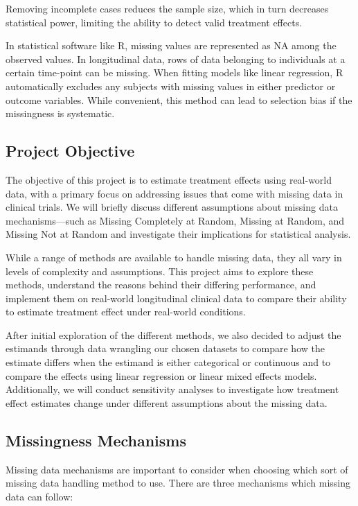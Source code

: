 \documentclass{article}
\begin{document}
Removing incomplete cases reduces the sample size, which in turn
decreases statistical power, limiting the ability to detect valid
treatment effects.

In statistical software like R, missing values are represented as NA
among the observed values. In longitudinal data, rows of data belonging
to individuals at a certain time-point can be missing. When fitting
models like linear regression, R automatically excludes any subjects
with missing values in either predictor or outcome variables. While
convenient, this method can lead to selection bias if the missingness is
systematic.

\subsection{Project Objective}\label{project-objective}

The objective of this project is to estimate treatment effects using
real-world data, with a primary focus on addressing issues that come
with missing data in clinical trials. We will briefly discuss different
assumptions about missing data mechanisms---such as Missing Completely
at Random, Missing at Random, and Missing Not at Random and investigate
their implications for statistical analysis.

While a range of methods are available to handle missing data, they all
vary in levels of complexity and assumptions. This project aims to
explore these methods, understand the reasons behind their differing
performance, and implement them on real-world longitudinal clinical data
to compare their ability to estimate treatment effect under real-world
conditions.

After initial exploration of the different methods, we also decided to
adjust the estimands through data wrangling our chosen datasets to
compare how the estimate differs when the estimand is either categorical
or continuous and to compare the effects using linear regression or
linear mixed effects models. Additionally, we will conduct sensitivity
analyses to investigate how treatment effect estimates change under
different assumptions about the missing data.

\subsection{Missingness Mechanisms}\label{missingness-mechanisms}

Missing data mechanisms are important to consider when choosing which
sort of missing data handling method to use. There are three mechanisms
which missing data can follow:
\end{document}

